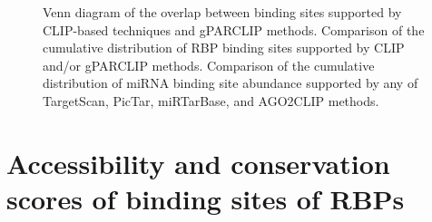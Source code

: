 \begin{figure}[H]
	\centering
\quad
\caption[Comparison of binding sites supported by CLIP and gPARCLIP]{Venn diagram of the overlap between binding sites supported by CLIP-based techniques and gPARCLIP methods.  Comparison of the cumulative distribution of RBP binding sites supported by CLIP and/or gPARCLIP methods.  Comparison of the cumulative distribution of miRNA binding site abundance supported by any of TargetScan, PicTar, miRTarBase, and AGO2CLIP methods.}
\label{sites_statistic}
\end{figure}

\clearpage
\section{Accessibility and conservation scores of binding sites of RBPs}

